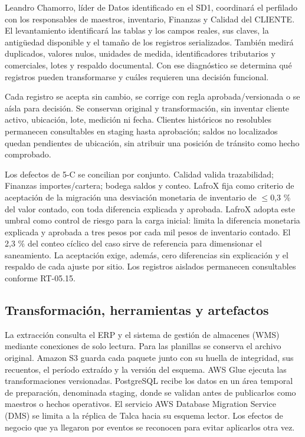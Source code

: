 Leandro Chamorro, líder de Datos identificado en el SD1, coordinará el perfilado con los responsables de maestros, inventario, Finanzas y Calidad del CLIENTE. El levantamiento identificará las tablas y los campos reales, sus claves, la antigüedad disponible y el tamaño de los registros serializados. También medirá duplicados, valores nulos, unidades de medida, identificadores tributarios y comerciales, lotes y respaldo documental. Con ese diagnóstico se determina qué registros pueden transformarse y cuáles requieren una decisión funcional.

Cada registro se acepta sin cambio, se corrige con regla aprobada/versionada o se aísla para decisión. Se conservan original y transformación, sin inventar cliente activo, ubicación, lote, medición ni fecha. Clientes históricos no resolubles permanecen consultables en staging hasta aprobación; saldos no localizados quedan pendientes de ubicación, sin atribuir una posición de tránsito como hecho comprobado.

Los defectos de 5-C se concilian por conjunto. Calidad valida trazabilidad; Finanzas importes/cartera; bodega saldos y conteo. LafroX fija como criterio de aceptación de la migración una desviación monetaria de inventario de \ensuremath{\leq}0,3 \% del valor contado, con toda diferencia explicada y aprobada. LafroX adopta este umbral como control de riesgo para la carga inicial: limita la diferencia monetaria explicada y aprobada a tres pesos por cada mil pesos de inventario contado. El 2,3 \% del conteo cíclico del caso sirve de referencia para dimensionar el saneamiento. La aceptación exige, además, cero diferencias sin explicación y el respaldo de cada ajuste por sitio. Los registros aislados permanecen consultables conforme RT-05.15.

\subsection{Transformación, herramientas y artefactos}
\label{sec:sd5-5-3-3}

La extracción consulta el ERP y el sistema de gestión de almacenes (WMS) mediante conexiones de solo lectura. Para las planillas se conserva el archivo original. Amazon S3 guarda cada paquete junto con su huella de integridad, sus recuentos, el período extraído y la versión del esquema. AWS Glue ejecuta las transformaciones versionadas. PostgreSQL recibe los datos en un área temporal de preparación, denominada staging, donde se validan antes de publicarlos como maestros o hechos operativos. El servicio AWS Database Migration Service (DMS) se limita a la réplica de Talca hacia su esquema lector. Los efectos de negocio que ya llegaron por eventos se reconocen para evitar aplicarlos otra vez.

